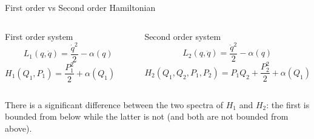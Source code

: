 \begin{frame}{First order vs Second order Hamiltonian}
  \vspace{0.5em}
  \begin{columns}
    \begin{column}{0.5\textwidth}
      \begin{center}
        \alert{First order system} \vspace{0.1em}
        \begin{equation*}
          L_1(q, \dot{q}) = \frac{\dot{q}^2}{2} - \alpha(q)
        \end{equation*}
        \begin{equation*} \label{eq: first-order_motion_eq_ham}
          H_1(Q_1, P_1) = \frac{P_1^2}{2} + \alpha(Q_1) \qquad
        \end{equation*}
      \end{center}
    \end{column}
    \begin{column}{0.5\textwidth}
      \begin{center}
        \alert{Second order system} \vspace{0.1em}
        \begin{equation*}
          L_2(q, \ddot{q}) = \frac{\ddot{q}^2}{2} - \alpha(q)
        \end{equation*}
        \begin{equation*} \label{eq: second-order_motion_eq_ham}
          H_2(Q_1, Q_2, P_1, P_2) = P_1Q_2 + \frac{P_2^2}{2} + \alpha(Q_1)
        \end{equation*}
      \end{center}
    \end{column}
  \end{columns}
  \vspace{2.0em}
  There is a significant difference between the two spectra of $H_1$ and
  $H_2$: the first is bounded from below while the latter is not (and both are
  not bounded from above).
\end{frame}
